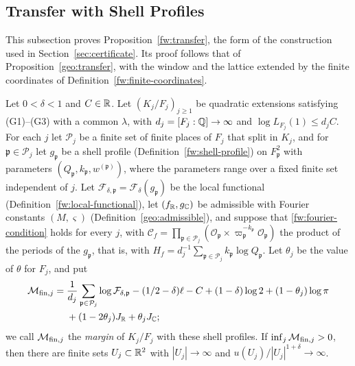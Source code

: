 \subsection{Transfer with Shell Profiles}

This subsection proves Proposition~\ref{fw:transfer}, the form of the
construction used in Section~\ref{sec:certificate}. Its proof follows that of
Proposition~\ref{geo:transfer}, with the window and the lattice extended by
the finite coordinates of Definition~\ref{fw:finite-coordinates}.

\begin{proposition}\label{fw:transfer}
Let $0<\delta<1$ and $C\in\mathbb R$. Let $(K_j/F_j)_{j\ge1}$ be quadratic
extensions satisfying (G1)--(G3) with a common $\lambda$, with
$d_j=[F_j:\mathbb Q]\to\infty$ and $\log L_{F_j}(1)\le d_jC$. For each $j$ let
$\mathcal P_j$ be a finite set of finite places of $F_j$ that split in
$K_j$, and for $\mathfrak p\in\mathcal P_j$ let $g_{\mathfrak p}$ be a
shell profile (Definition~\ref{fw:shell-profile}) on $F_{\mathfrak p}^2$ with
parameters $(Q_{\mathfrak p},k_{\mathfrak p},w^{(\mathfrak p)})$, where the
parameters range over a fixed finite set independent of $j$. Let
$\mathcal F_{\delta,\mathfrak p}=\mathcal F_\delta(g_{\mathfrak p})$ be the
local functional (Definition~\ref{fw:local-functional}), let $(f_\mathbb R,g_\mathbb C)$ be
admissible with Fourier constants $(M,\varsigma)$
(Definition~\ref{geo:admissible}), and suppose that
\eqref{fw:fourier-condition} holds for every $j$, with $\mathcal
C_f=\prod_{\mathfrak p\in\mathcal P_j}(\mathcal O_{\mathfrak
p}\times\varpi_{\mathfrak p}^{-k_{\mathfrak p}}\mathcal O_{\mathfrak p})$
the product of the periods of the $g_{\mathfrak p}$, that is, with
$H_f=d_j^{-1}\sum_{\mathfrak p\in\mathcal P_j}k_{\mathfrak p}\log
Q_{\mathfrak p}$. Let $\theta_j$ be the value of $\theta$ for $F_j$, and
put
\begin{equation}\label{fw:margin}
 \begin{split}
 \mathcal M_{{\rm fin},j}={}&
 \frac1{d_j}\sum_{\mathfrak p\in\mathcal P_j}\log\mathcal F_{\delta,\mathfrak p}
 -(1/2-\delta)\ell-C+(1-\delta)\log2+(1-\theta_j)\log\pi\\
 &+(1-2\theta_j)J_\mathbb R+\theta_jJ_\mathbb C ;
 \end{split}
\end{equation}
we call $\mathcal M_{{\rm fin},j}$ the \emph{margin} of $K_j/F_j$ with
these shell profiles. If $\inf_j\mathcal M_{{\rm fin},j}>0$, then there
are finite sets $U_j\subset\mathbb R^2$ with $|U_j|\to\infty$ and
$u(U_j)/|U_j|^{1+\delta}\to\infty$.
\end{proposition}

